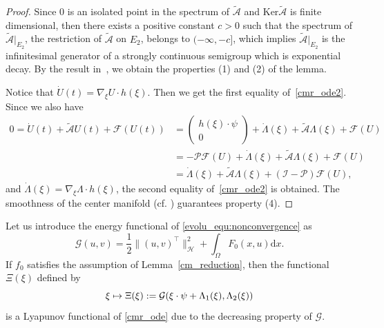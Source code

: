 \documentclass{elsarticle}
\begin{document}
\begin{proof}
Since $0$ is an isolated point in the spectrum of $\tilde{\mathcal{A}}$ and $\mathrm{Ker}\tilde{\mathcal{A}}$ is finite dimensional, then there exists a positive constant $c > 0$ such that the spectrum of $\tilde{\mathcal{A}}|_{E_2}$, the restriction of $\tilde{\mathcal{A}}$ on $E_2$, belongs to $(-\infty, -c]$, which implies $\tilde{\mathcal{A}}|_{E_2}$ is the infinitesimal generator of a strongly continuous semigroup which is exponential decay. By the result in~\cite[Section 3]{Vanderbauwhede1992}, we obtain the properties (1) and (2) of the lemma.

Notice that $\dot{U}(t) = \nabla_{\xi} U \cdot h(\xi)$. Then we get the first equality of~\eqref{cmr_ode2}. Since we also have
\begin{equation*}
\begin{aligned}
0=\dot{U}(t) +\tilde{\mathcal{A}}U(t) + \mathcal{F}(U(t)) &= 
\left(
\begin{array}{c}
h(\xi)\cdot\psi \\
0
\end{array}
\right)
+ \dot{\Lambda}(\xi) + \tilde{\mathcal{A}}\Lambda(\xi) + \mathcal{F}(U)\\
&=-\mathcal{P}\mathcal{F}(U) + \dot{\Lambda}(\xi) + \tilde{\mathcal{A}}\Lambda(\xi) + \mathcal{F}(U) \\
&=\dot{\Lambda}(\xi)+ \tilde{\mathcal{A}}\Lambda(\xi) + (\mathcal{I}-\mathcal{P})\mathcal{F}(U),
\end{aligned}
\end{equation*}
and $\dot{\Lambda}(\xi) = \nabla_{\xi} \Lambda \cdot h(\xi)$, the second equality of~\eqref{cmr_ode2} is obtained.
The smoothness of the center manifold (cf. \cite[Theorem 2]{Vanderbauwhede1992}) guarantees property (4).
\end{proof}

Let us introduce the energy functional of \eqref{evolu_equ:nonconvergence} as
\[
\mathcal{G}(u, v)=\frac{1}{2}\|(u, v)^{\top}\|^2_{\mathcal{H}} + \int_{\Omega}F_0(x, u)\mathrm{d}x.
\]
If $f_0$ satisfies the assumption of Lemma~\ref{cm_reduction}, then the functional $\Xi(\xi)$ defined by
\begin{equation*} \label{Lyapunov_function}
\xi\mapsto\Xi(\xi) :=\mathcal{G}(\xi\cdot\psi + \Lambda_1(\xi), \Lambda_2(\xi))\\
\end{equation*}
is a Lyapunov functional of \eqref{cmr_ode} due to the decreasing property of $\mathcal{G}$. 
\end{document}
